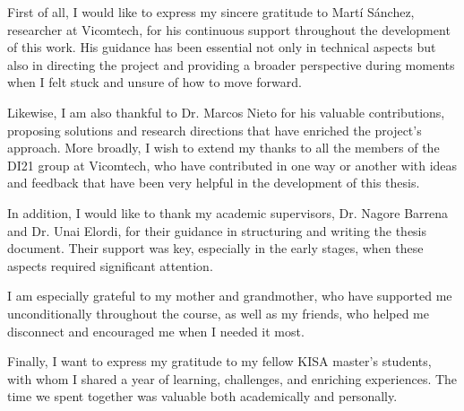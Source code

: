 First of all, I would like to express my sincere gratitude to Martí Sánchez, researcher at Vicomtech, for his continuous support throughout the development of this work. His guidance has been essential not only in technical aspects but also in directing the project and providing a broader perspective during moments when I felt stuck and unsure of how to move forward.

Likewise, I am also thankful to Dr. Marcos Nieto for his valuable contributions, proposing solutions and research directions that have enriched the project's approach. More broadly, I wish to extend my thanks to all the members of the DI21 group at Vicomtech, who have contributed in one way or another with ideas and feedback that have been very helpful in the development of this thesis.

In addition, I would like to thank my academic supervisors, Dr. Nagore Barrena and Dr. Unai Elordi, for their guidance in structuring and writing the thesis document. Their support was key, especially in the early stages, when these aspects required significant attention.

I am especially grateful to my mother and grandmother, who have supported me unconditionally throughout the course, as well as my friends, who helped me disconnect and encouraged me when I needed it most.

Finally, I want to express my gratitude to my fellow KISA master's students, with whom I shared a year of learning, challenges, and enriching experiences. The time we spent together was valuable both academically and personally.


